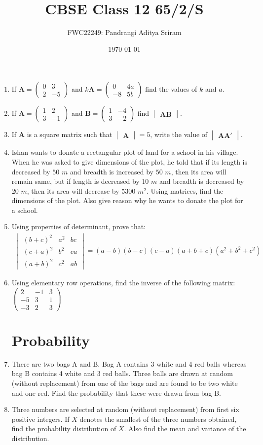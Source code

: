 \documentclass[12pt,-letter paper]{article}
\title{CBSE Class 12 65/2/S}
\date{\today}
\author{FWC22249: Pandrangi Aditya Sriram}
\providecommand{\brak}[1]{\ensuremath{\left(#1\right)}}
\theoremstyle{remark}
\newcommand{\myvec}[1]{\ensuremath{\begin{pmatrix}#1\end{pmatrix}}}
\newcommand{\mydet}[1]{\ensuremath{\begin{vmatrix}#1\end{vmatrix}}}
\let\vec\mathbf
\begin{document}
\maketitle

\begin{enumerate}
\section{Matrices}
\item If $\vec{A} = \myvec{0 & 3 \\ 2 & -5}$ and $k\vec{A} = \myvec{0 & 4a \\ -8 & 5b}$ find the values of $k$ and $a$.
\item If $\vec{A} = \myvec{1 & 2 \\ 3 & -1}$ and $\vec{B} = \myvec{1 & -4 \\ 3 & -2}$ find $\mydet{\vec{A}\vec{B}}$.
\item If $\vec{A}$ is a square matrix such that $\mydet{\vec{A}} = 5$, write the value of $\mydet{\vec{A}\vec{A}'}$.
\item Ishan wants to donate a rectangular plot of land for a school in his village. When he was asked to give dimensions of the plot, he told that if its length is decreased by $50$ $m$ and breadth is increased by $50$ $m$, then its area will remain same, but if length is decreased by $10$ $m$ and breadth is decreased by $20$ $m$, then its area will decrease by $5300$ $m^2$. Using matrices, find the dimensions of the plot. Also give reason why he wants to donate the plot for a school.
\item Using properties of determinant, prove that:
\begin{align*}
\mydet{\brak{b+c}^2 & a^2 & bc \\ \brak{c+a}^2 & b^2 & ca \\ \brak{a+b}^2 & c^2 & ab} = \brak{a-b}\brak{b-c}\brak{c-a}\brak{a+b+c}\brak{a^2 + b^2 + c^2}
\end{align*}
\item Using elementary row operations, find the inverse of the following matrix: $\myvec{2 & -1 & 3 \\ -5 & 3 & 1 \\ -3 & 2 & 3}$
\section{Probability}
\item There are two bags A and B. Bag A contains 3 white and 4 red balls whereas bag B contains 4 white and 3 red balls. Three balls are drawn at random (without replacement) from one of the bags and are found to be two white and one red. Find the probability that these were drawn from bag B.
\item Three numbers are selected at random (without replacement) from first six positive integers. If $X$ denotes the smallest of the three numbers obtained, find the probability distribution of $X$. Also find the mean and variance of the distribution.

\end{enumerate}
\end{document}
